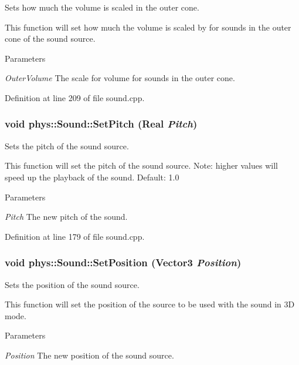 Sets how much the volume is scaled in the outer cone. 

This function will set how much the volume is scaled by for sounds in the outer cone of the sound source. 
\begin{DoxyParams}{Parameters}
\item[{\em OuterVolume}]The scale for volume for sounds in the outer cone. \end{DoxyParams}


Definition at line 209 of file sound.cpp.

\hypertarget{classphys_1_1Sound_a4c7eac57c162f264d8c0868c4f360aab}{
\subsubsection[{SetPitch}]{\setlength{\rightskip}{0pt plus 5cm}void phys::Sound::SetPitch ({\bf Real} {\em Pitch})}}
\label{dc/d2f/classphys_1_1Sound_a4c7eac57c162f264d8c0868c4f360aab}


Sets the pitch of the sound source. 

This function will set the pitch of the sound source. Note: higher values will speed up the playback of the sound. Default: 1.0 
\begin{DoxyParams}{Parameters}
\item[{\em Pitch}]The new pitch of the sound. \end{DoxyParams}


Definition at line 179 of file sound.cpp.

\hypertarget{classphys_1_1Sound_a245bc4d760bcf30e9520aee00cf40c61}{
\subsubsection[{SetPosition}]{\setlength{\rightskip}{0pt plus 5cm}void phys::Sound::SetPosition ({\bf Vector3} {\em Position})}}
\label{dc/d2f/classphys_1_1Sound_a245bc4d760bcf30e9520aee00cf40c61}


Sets the position of the sound source. 

This function will set the position of the source to be used with the sound in 3D mode. 
\begin{DoxyParams}{Parameters}
\item[{\em Position}]The new position of the sound source. \end{DoxyParams}



